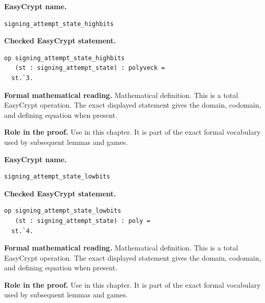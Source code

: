 \begin{formaldefinition}
\noindent\textbf{EasyCrypt name.}
\begin{lstlisting}[language=EasyCrypt,basicstyle=\ttfamily\scriptsize]
signing_attempt_state_highbits
\end{lstlisting}
\noindent\textbf{Checked EasyCrypt statement.}
\begin{lstlisting}[language=EasyCrypt,basicstyle=\ttfamily\scriptsize]
op signing_attempt_state_highbits
   (st : signing_attempt_state) : polyveck =
  st.`3.
\end{lstlisting}
\noindent\textbf{Formal mathematical reading.}
Mathematical definition. This is a total EasyCrypt operation.  The exact displayed statement gives the domain, codomain, and defining equation when present.

\noindent\textbf{Role in the proof.}
Use in this chapter. It is part of the exact formal vocabulary used by subsequent lemmas and games.

\end{formaldefinition}

\begin{formaldefinition}
\noindent\textbf{EasyCrypt name.}
\begin{lstlisting}[language=EasyCrypt,basicstyle=\ttfamily\scriptsize]
signing_attempt_state_lowbits
\end{lstlisting}
\noindent\textbf{Checked EasyCrypt statement.}
\begin{lstlisting}[language=EasyCrypt,basicstyle=\ttfamily\scriptsize]
op signing_attempt_state_lowbits
   (st : signing_attempt_state) : poly =
  st.`4.
\end{lstlisting}
\noindent\textbf{Formal mathematical reading.}
Mathematical definition. This is a total EasyCrypt operation.  The exact displayed statement gives the domain, codomain, and defining equation when present.

\noindent\textbf{Role in the proof.}
Use in this chapter. It is part of the exact formal vocabulary used by subsequent lemmas and games.

\end{formaldefinition}

